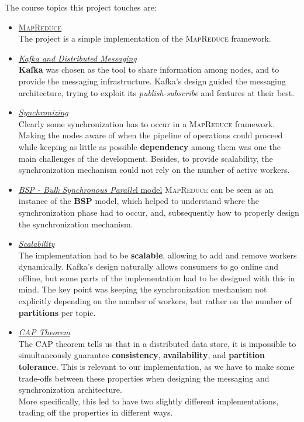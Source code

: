 {The course topics this project touches are:\ns
\begin{itemize}
   \item \ul{\textsc{MapReduce}}\\
   The project is a simple implementation of the \textsc{MapReduce} framework.
   \item \ul{\textit{Kafka and Distributed Messaging}}\\
   \textbf{Kafka} was chosen as the tool to share information among nodes, and to provide the messaging infrastructure. Kafka's design guided the messaging architecture, trying to exploit its \textit{publish-subscribe} and features at their best.
   \item \ul{\textit{Synchronizing}}\\
   Clearly some synchronization has to occur in a \textsc{MapReduce} framework. Making the nodes aware of when the pipeline of operations could proceed while keeping as little as possible \textbf{dependency} among them was one the main challenges of the development.
   Besides, to provide scalability, the synchronization mechanism could not rely on the number of active workers.
   \item \ul{\textit{BSP - Bulk Synchronous Paralle}l model}
   \textsc{MapReduce} can be seen as an instance of the \textbf{BSP} model, which helped to understand where the synchronization phase had to occur, and, subsequently how to properly design the synchronization mechanism.
   \item \ul{\textit{Scalability}}\\
   The implementation had to be \textbf{scalable}, allowing to add and remove workers dynamically. Kafka's design naturally allows consumers to go online and offline, but some parts of the implementation had to be designed with this in mind. The key point was keeping the synchronization mechanism not explicitly depending on the number of workers, but rather on the number of \textbf{partitions} per topic.
   \item \ul{\textit{CAP Theorem}}\\
   The CAP theorem tells us that in a distributed data store, it is impossible to simultaneously guarantee \textbf{consistency}, \textbf{availability}, and \textbf{partition tolerance}. This is relevant to our implementation, as we have to make some trade-offs between these properties when designing the messaging and synchronization architecture.\\
   More specifically, this led to have two slightly different implementations, trading off the properties in different ways. 
\end{itemize}}


